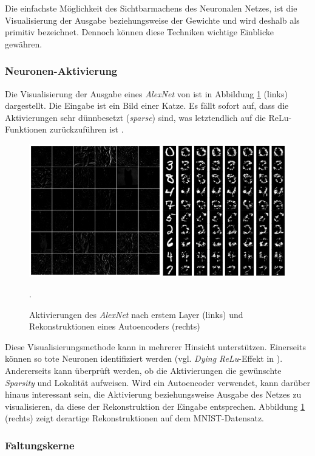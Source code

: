 Die einfachste Möglichkeit des Sichtbarmachens des Neuronalen Netzes, ist die Visualisierung der Ausgabe beziehungsweise der Gewichte und wird deshalb als primitiv bezeichnet. Dennoch können diese Techniken wichtige Einblicke gewähren.

\subsubsection{Neuronen-Aktivierung}

Die Visualisierung der Ausgabe eines \textit{AlexNet} von \cite{Krizhevsky2012} ist in Abbildung \ref{fig:4_output} (links) dargestellt. Die Eingabe ist ein Bild einer Katze. Es fällt sofort auf, dass die Aktivierungen sehr dünnbesetzt (\textit{sparse}) sind, was letztendlich auf die ReLu-Funktionen zurückzuführen ist \cite[vgl.][]{Glorot2011}.

\begin{figure}
\centering
\includegraphics[width=0.6\linewidth]{images/4_output}
\caption[]{Aktivierungen des \textit{AlexNet} nach erstem Layer (links)  \cite[siehe][]{Kaparthy2014} und Rekonstruktionen eines Autoencoders (rechts) \cite[siehe][]{Vincent2010}}.
\label{fig:4_output}
\end{figure}

Diese Visualisierungsmethode kann in mehrerer Hinsicht unterstützen. Einerseits können so tote Neuronen identifiziert werden (vgl. \textit{Dying ReLu}-Effekt in \cite{Maas2013}). Andererseits kann überprüft werden, ob die Aktivierungen die gewünschte \textit{Sparsity} und Lokalität aufweisen.
Wird ein Autoencoder verwendet, kann darüber hinaus interessant sein, die Aktivierung beziehungsweise Ausgabe des Netzes zu visualisieren, da diese der Rekonstruktion der Eingabe entsprechen. Abbildung \ref{fig:4_output} (rechts) zeigt derartige Rekonstruktionen auf dem MNIST-Datensatz.

\subsubsection{Faltungskerne}

